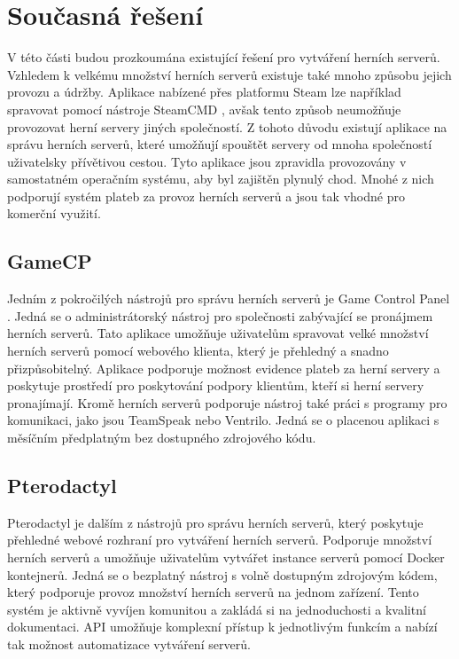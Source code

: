 \chapter[Současná řešení]{Současná řešení}

V této části budou prozkoumána existující řešení pro vytváření herních serverů.
Vzhledem k velkému množství herních serverů existuje také mnoho způsobu jejich provozu a údržby. Aplikace nabízené přes platformu Steam
lze například spravovat pomocí nástroje SteamCMD \cite{steamcmd}, avšak tento způsob neumožňuje provozovat herní servery jiných společností.
Z tohoto důvodu existují aplikace na správu herních serverů, které umožňují spouštět servery od mnoha společností uživatelsky přívětivou cestou.
Tyto aplikace jsou zpravidla provozovány v samostatném operačním systému, aby byl zajištěn plynulý chod.
Mnohé z nich podporují systém plateb za provoz herních serverů a jsou tak vhodné pro komerční využití.

\section{GameCP}

Jedním z pokročilých nástrojů pro správu herních serverů je Game Control Panel \cite{gamecp}. Jedná se o administrátorský nástroj pro společnosti
zabývající se pronájmem herních serverů. Tato aplikace umožňuje uživatelům spravovat velké množství herních serverů pomocí webového klienta,
který je přehledný a snadno přizpůsobitelný. Aplikace podporuje možnost evidence plateb za herní servery a poskytuje prostředí pro poskytování
podpory klientům, kteří si herní servery pronajímají. Kromě herních serverů podporuje nástroj také práci s programy pro komunikaci, jako jsou TeamSpeak
nebo Ventrilo. Jedná se o placenou aplikaci s měsíčním předplatným bez dostupného zdrojového kódu.

\section{Pterodactyl}

Pterodactyl \cite{pterodactyl} je dalším z nástrojů pro správu herních serverů, který poskytuje přehledné webové rozhraní pro vytváření herních serverů.
Podporuje množství herních serverů a umožňuje uživatelům vytvářet instance serverů pomocí Docker kontejnerů. Jedná se o bezplatný nástroj
s volně dostupným zdrojovým kódem, který podporuje provoz množství herních serverů na jednom zařízení. Tento systém je aktivně vyvíjen komunitou
a zakládá si na jednoduchosti a kvalitní dokumentaci. API umožňuje komplexní přístup k jednotlivým funkcím a nabízí tak možnost automatizace
vytváření serverů.

